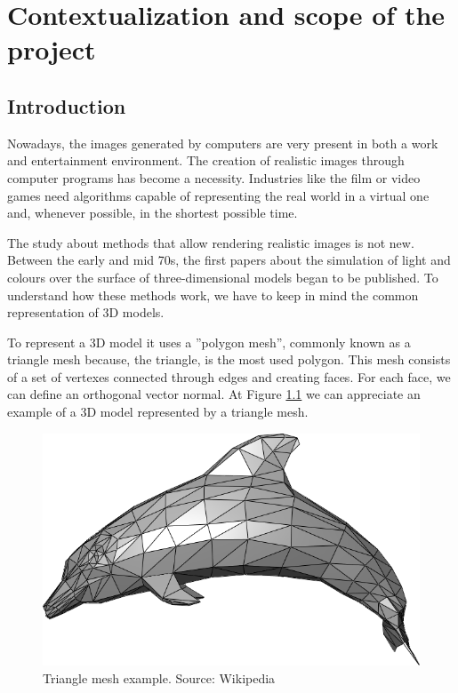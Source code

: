 \documentclass[titlepage,12pt]{report}
\begin{document}
\iftrue

\newpage
\tableofcontents*
\fi

\newpage

\chapter{Contextualization and scope of the project}

\section{Introduction} \label{introduction}

Nowadays, the images generated by computers are very present in both a work and entertainment environment. The creation of realistic images through computer programs has become a necessity. Industries like the film or video games need algorithms capable of representing the real world in a virtual one and, whenever possible, in the shortest possible time.

The study about methods that allow rendering realistic images is not new. Between the early and mid 70s, the first papers about the simulation of light and colours over the surface of three-dimensional models began to be published. To understand how these methods work, we have to keep in mind the common representation of 3D models.

To represent a 3D model it uses a ''polygon mesh'', commonly known as a triangle mesh because, the triangle, is the most used polygon. This mesh consists of a set of vertexes connected through edges and creating faces.  For each face, we can define an orthogonal vector normal. At Figure \ref{dolphin} we can appreciate an example of a 3D model represented by a triangle mesh.

\begin{figure}[H]
	\centering
	\includegraphics[scale=0.15]{media/Dolphin_triangle_mesh.png}
	\caption{Triangle mesh example. Source: Wikipedia}
	\label{dolphin}
\end{figure}
\end{document}

